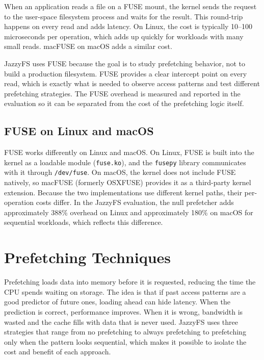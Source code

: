 \documentclass[12pt]{report}
\begin{document}
When an application reads a file on a FUSE mount, the kernel sends the
request to the user-space filesystem process and waits for the result. This
round-trip happens on every read and adds latency. On Linux, the cost is
typically 10--100 microseconds per operation, which adds up quickly for
workloads with many small reads. macFUSE on macOS adds a similar cost.

JazzyFS uses FUSE because the goal is to study prefetching behavior, not to
build a production filesystem. FUSE provides a clear intercept point on
every read, which is exactly what is needed to observe access patterns and
test different prefetching strategies. The FUSE overhead is measured and
reported in the evaluation so it can be separated from the cost of the
prefetching logic itself.

\subsection{FUSE on Linux and macOS}

FUSE works differently on Linux and macOS. On Linux, FUSE is built into
the kernel as a loadable module (\texttt{fuse.ko}), and the \texttt{fusepy}
library communicates with it through \texttt{/dev/fuse}. On macOS, the
kernel does not include FUSE natively, so macFUSE (formerly OSXFUSE)
provides it as a third-party kernel extension. Because the two
implementations use different kernel paths, their per-operation costs
differ. In the JazzyFS evaluation, the null prefetcher adds approximately
388\% overhead on Linux and approximately 180\% on macOS for sequential
workloads, which reflects this difference.

\section{Prefetching Techniques}
\label{sec:bg-prefetch}

Prefetching loads data into memory before it is requested, reducing the
time the CPU spends waiting on storage. The idea is that if past access
patterns are a good predictor of future ones, loading ahead can hide
latency. When the prediction is correct, performance improves. When it is
wrong, bandwidth is wasted and the cache fills with data that is never
used. JazzyFS uses three strategies that range from no prefetching to
always prefetching to prefetching only when the pattern looks sequential,
which makes it possible to isolate the cost and benefit of each approach.
\end{document}
